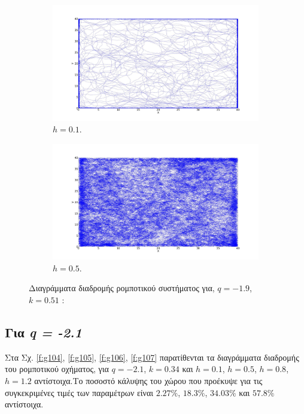 \begin{figure}[ht]
	\centering
	\begin{subfigure}[b]{0.55\textwidth}
		\centering
		\includegraphics[width=\textwidth]{LateX images/log/h/g1-1.9}
		\caption{$h =0.1$.}
		\label{f:g102}
	\end{subfigure}
	\hfill
	\begin{subfigure}[b]{0.55\textwidth}
		\centering
		\includegraphics[width=\textwidth]{LateX images/log/h/g2-1.9}
		\caption{$h =0.5$.}
		\label{f:g103}
	\end{subfigure}
	\hfill
	\caption{Διαγράμματα διαδρομής ρομποτικού συστήματος για, $q = -1.9$, $k = 0.51$ :}
\end{figure}

\clearpage

\subsection{Για \emph{q = -2.1}}

Στα Σχ. \ref{f:g104}, \ref{f:g105}, \ref{f:g106}, \ref{f:g107} παρατίθενται τα διαγράμματα διαδρομής του ρομποτικού οχήματος, για $q = -2.1$, $k = 0.34$ και $h =0.1$, $h =0.5$, $h =0.8$, $h =1.2$ αντίστοιχα.Tο ποσοστό κάλυψης του χώρου που προέκυψε για τις συγκεκριμένες τιμές των παραμέτρων είναι $2.27\%$, $18.3\%$, $34.03\%$ και $57.8\%$ αντίστοιχα.


